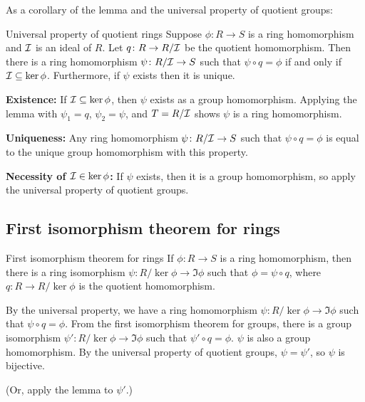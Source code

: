 \documentclass[12pt,letterpaper]{report}
\begin{document}
As a corollary of the lemma and the universal property of quotient groups:

\begin{thm}{Universal property of quotient rings}{}
  Suppose $\phi \colon R \to S$ is a ring homomorphism and $\mathcal{I}$ is an ideal of $R$.
  Let $q \colon R \to R/\mathcal{I}$ be the quotient homomorphism.
  Then there is a ring homomorphism $\psi \colon R/\mathcal{I} \to S$ such that $\psi \circ q = \phi$ if
  and only if $\mathcal{I} \subseteq \ker\phi$.
  Furthermore, if $\psi$ exists then it is unique.
\end{thm}

\begin{thmproof}
  \textbf{Existence:}
  If $\mathcal{I} \subseteq \ker\phi$, then $\psi$ exists as a group homomorphism.
  Applying the lemma with $\psi_1 = q$, $\psi_2 = \psi$, and $T = R/\mathcal{I}$ shows $\psi$ is a ring
  homomorphism.

  \textbf{Uniqueness:}
  Any ring homomorphism $\psi \colon R/\mathcal{I} \to S$ such that $\psi \circ q = \phi$ is equal to the
  unique group homomorphism with this property.

  \textbf{Necessity of $\mathcal{I} \in \ker\phi$:}
  If $\psi$ exists, then it is a group homomorphism, so apply the universal property of quotient
  groups.
\end{thmproof}

\pagebreak
\subsection{First isomorphism theorem for rings}

\begin{thm}{First isomorphism theorem for rings}{}
  If $\phi \colon R \to S$ is a ring homomorphism, then there is a ring isomorphism
  $\psi \colon R/\ker\phi \to \Im\phi$ such that $\phi = \psi \circ q$, where
  $q \colon R \to R/\ker\phi$ is the quotient homomorphism.
\end{thm}

\begin{thmproof}
  By the universal property, we have a ring homomorphism $\psi \colon R/\ker\phi \to \Im\phi$ such
  that $\psi \circ q = \phi$.
  From the first isomorphism theorem for groups, there is a group isomorphism
  $\psi' \colon R/\ker\phi \to \Im\phi$ such that $\psi' \circ q = \phi$.
  $\psi$ is also a group homomorphism.
  By the universal property of quotient groups, $\psi = \psi'$, so $\psi$ is bijective.

  (Or, apply the lemma to $\psi'$.)
\end{thmproof}
\end{document}
